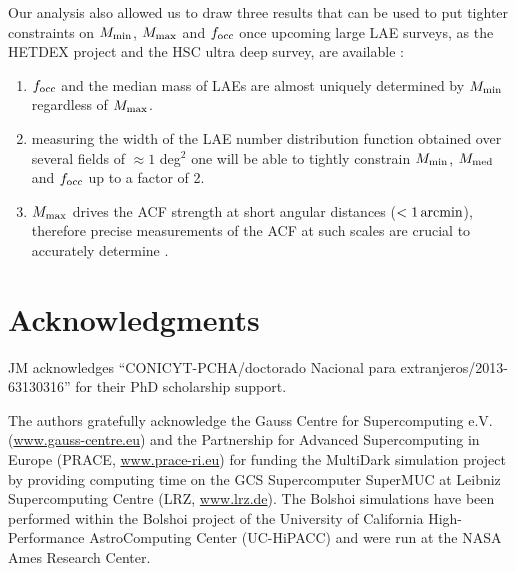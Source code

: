 \documentclass{emulateapj}
\newcommand{\mmax}{{\ifmmode{{M_{\rm max}}}\else{${M_{\rm max}}$}\fi}}
\begin{document}
Our analysis also allowed us to draw three results that can be used to
put tighter constraints on $M_{\rm min}$, $M_{\rm max}$ and $f_{\rm
  occ}$ once upcoming large LAE surveys, as the HETDEX project
\citep{Hetdex2011} and the HSC ultra deep survey, are available : 
\begin{enumerate}
\item $f_{\rm occ}$ and the median mass of LAEs are almost uniquely
  determined by $M_{\rm min}$ regardless of $M_{\rm max}$. \item
  measuring the width of the LAE number distribution function obtained
  over several fields of $\approx 1$ deg$^2$ one will be able to
  tightly constrain  $M_{\rm min}$, $M_{\rm med}$ and $f_{\rm occ}$ up
  to a factor of  2.  
\item  $M_{\rm max}$ drives the ACF strength at short angular
  distances ($<1\,\rm arcmin$), therefore precise measurements of the
  ACF at such scales are crucial to accurately determine \mmax. 
\end{enumerate}



\section*{Acknowledgments} 

JM acknowledges ``CONICYT-PCHA/doctorado Nacional para
extranjeros/2013-63130316'' for their PhD scholarship support.  

The authors gratefully acknowledge the Gauss Centre for Supercomputing
e.V. (\url{www.gauss-centre.eu}) and the Partnership for Advanced
Supercomputing in Europe (PRACE, \url{www.prace-ri.eu}) for funding the
MultiDark simulation project by providing computing time on the GCS
Supercomputer SuperMUC at Leibniz Supercomputing Centre (LRZ,
\url{www.lrz.de}). The Bolshoi simulations have been performed within the
Bolshoi project of the University of California High-Performance
AstroComputing Center (UC-HiPACC) and were run at the NASA Ames
Research Center. 




\end{document}
